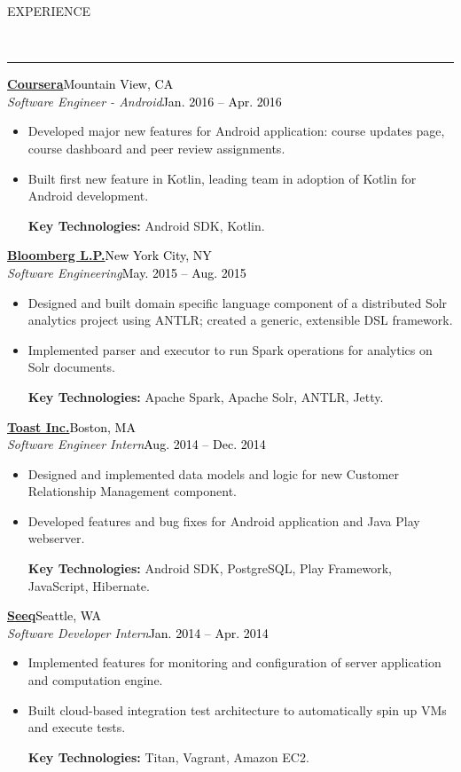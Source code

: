 \documentclass[11pt, letterpaper, oneside]{article}
\newcommand{\HRule}[2]{\textcolor{#1}{\rule{\linewidth}{#2}}}
\newcommand{\sectiontitle}[1]{\begin{minipage}{\textwidth}\vspace{-7.5pt}\begin{flushleft}\hspace{-20.5pt}\vspace{-25pt}
\Large\MakeUppercase{#1}\end{flushleft}\end{minipage}\\\HRule{black}{0.15mm}\vspace{\baselineskip}}
\newenvironment{ressection}[1]{
  \sectiontitle{#1}}
  {\vspace{-\baselineskip}}
\newcommand{\resentryheader}[4]{
    \vspace{-6pt}
    \textbf{#1}\hspace{\stretch{1}}\textcolor{black}{#3}\\
    \textit{#2}\hspace{\stretch{1}}\textcolor{black}{#4}\\
}
\newcommand{\resitem}[1]{
    \vspace{2pt}
    \item \begin{flushleft} #1 \end{flushleft}
}
\newenvironment{resentry}[4]{
  \begin{minipage}{\textwidth}
  \vspace{-3pt}
    \resentryheader{#1}{#2}{#3}{#4}
        \vspace{-\baselineskip}
    \begin{itemize}[noitemsep,nolistsep]
}{
    \end{itemize}
        \vspace{\baselineskip}
        \end{minipage}
}
\begin{document}
\begin{ressection}{Experience}
 \begin{resentry}{\href{https://www.coursera.org/}{Coursera}}{Software Engineer - Android}{Mountain View, CA}{Jan. 2016 -- Apr. 2016}
    \resitem{Developed major new features for Android application: course updates page, course dashboard and peer review assignments.}
    \resitem{Built first new feature in Kotlin, leading team in adoption of Kotlin for Android development.}
    \vspace{3pt} \hspace{-15pt}
    \textbf{Key Technologies:} Android SDK, Kotlin.
    \vspace{6pt} 
  \end{resentry}  
  \begin{resentry}{\href{http://www.bloomberg.com/professional/}{Bloomberg L.P.}}{Software Engineering}{New York City, NY}{May. 2015 -- Aug. 2015}
    \resitem{Designed and built domain specific language component of a distributed Solr analytics project using ANTLR; created a generic, extensible DSL framework.}
    \resitem{Implemented parser and executor to run Spark operations for analytics on Solr documents.}
    \vspace{3pt} \hspace{-15pt}
    \textbf{Key Technologies:} Apache Spark, Apache Solr, ANTLR, Jetty.
    \vspace{6pt} 
  \end{resentry}  
  \begin{resentry}{\href{http://pos.toasttab.com/}{Toast Inc.}}{Software Engineer Intern}{Boston, MA}{Aug. 2014 -- Dec. 2014}
   \resitem{Designed and implemented data models and logic for new Customer Relationship Management component. }
    \resitem{Developed features and bug fixes for Android application and Java Play webserver.}
    \vspace{3pt}  \hspace{-15pt}
    \textbf{Key Technologies:} Android SDK, PostgreSQL, Play Framework, JavaScript, Hibernate.
	\vspace{6pt}   
  \end{resentry}  
  \begin{resentry}{\href{http://www.seeq.com/}{Seeq}}{Software Developer Intern}{Seattle, WA}{Jan. 2014 -- Apr. 2014}
    \resitem{Implemented features for monitoring and configuration of server application and computation engine.}    
    \resitem{Built cloud-based integration test architecture to automatically spin up VMs and execute tests.}
    \vspace{3pt} \hspace{-15pt}
    \textbf{Key Technologies:} Titan, Vagrant, Amazon EC2.
	\vspace{6pt}   
  \end{resentry}
\end{ressection}
\end{document}
